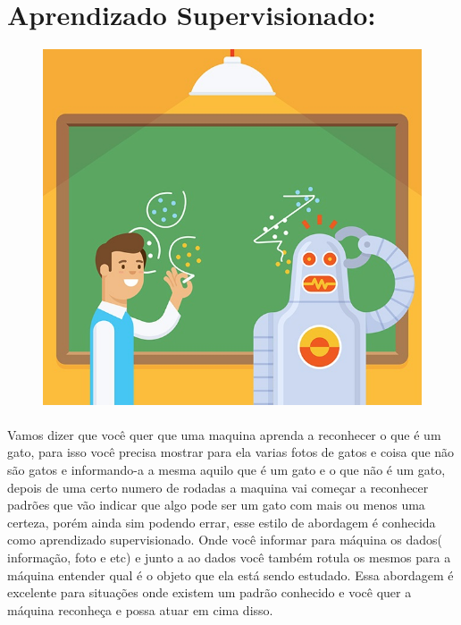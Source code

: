 \documentclass[12pt]{article}
\begin{document}
    \section{Aprendizado Supervisionado:}
    \begin{figure}[ht]
        \centering
        \includegraphics[scale=0.3]{robo_aprendedo.jpg}
    \end{figure}
    \paragraph{}Vamos dizer que você quer que uma maquina aprenda a reconhecer o que é um gato, para isso você
    precisa mostrar para ela varias fotos de gatos e coisa que não são gatos e informando-a a mesma aquilo que é um gato 
    e o que não é um gato, depois de uma certo numero de rodadas a maquina vai começar a reconhecer padrões que vão indicar que 
    algo pode ser um gato com mais ou menos uma certeza, porém ainda sim podendo errar, 
    esse estilo de abordagem é conhecida como aprendizado supervisionado. Onde você informar para máquina os dados( informação,
     foto e etc) e junto a ao dados você também rotula os mesmos para a máquina entender qual é o objeto que ela está sendo
     estudado.  
    Essa abordagem é excelente para situações onde existem um padrão conhecido e você quer a máquina 
    reconheça e possa atuar em cima disso.
\end{document}
